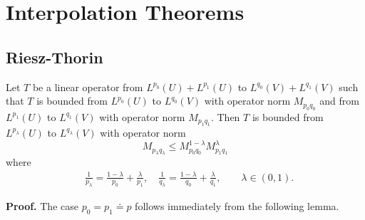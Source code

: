 \chapter{Interpolation Theorems}
\section{Riesz-Thorin}
\label{sec:riesz-thorin}
%
%
%
%
%
%
%
%
\begin{theorem}
\label{thm:riesz-thorin} 
Let $T$ be a linear operator from $L^{p_{0}}(U) + L^{p_{1}}(U)$ to
$L^{q_{0}}(V) + L^{q_{1}}(V)$ such that $T$ is bounded
from $L^{p_0}(U)$ to $L^{q_0}(V)$ with operator norm $M_{p_{0}q_{0}}$ and from
$L^{p_{1}}(U)$ to $L^{q_1}(V)$ with operator norm $M_{p_{1}q_{1}}$. Then $T$ is
bounded from $L^{p_{\lambda}}(U)$ to $L^{q_{\lambda}}(V)$ with operator norm
%
%
\begin{equation}
\label{riesz-op-norm}
M_{p_{\lambda}q_{\lambda}} \le M_{p_{0}q_{0}}^{1-\lambda}M_{p_{1}q_{1}}^{\lambda}
\end{equation}
%
%
where 
%
%
\begin{equation}
\begin{split}
\label{riesz-op-norm-params}
& \frac{1}{p_\lambda}  = \frac{1-\lambda}{p_0} + \frac{\lambda}{p_1},
\quad  \frac{1}{q_\lambda} = \frac{1-\lambda}{q_0} + \frac{\lambda}{q_1}, \qquad
\lambda \in (0,1).
\end{split}
\end{equation}
%
%
%
%
\end{theorem}
%
%
{\bf Proof.} The case $p_0 = p_1 \doteq p$ follows immediately from the
following lemma.
%
%
%
%

